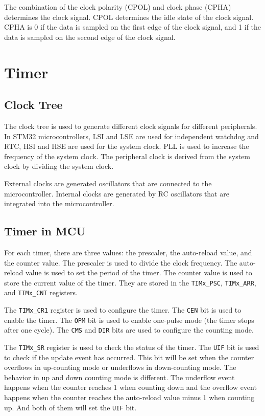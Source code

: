 \documentclass[a4paper,12pt]{article}
\begin{document}
The combination of the clock polarity (CPOL) and clock phase (CPHA) determines the clock signal. CPOL determines the idle state of the clock signal. CPHA is 0 if the data is sampled on the first edge of the clock signal, and 1 if the data is sampled on the second edge of the clock signal.

\section{Timer}

\subsection{Clock Tree}

The clock tree is used to generate different clock signals for different peripherals. In STM32 microcontrollers, LSI and LSE are used for independent watchdog and RTC, HSI and HSE are used for the system clock. PLL is used to increase the frequency of the system clock. The peripheral clock is derived from the system clock by dividing the system clock.

External clocks are generated oscillators that are connected to the microcontroller. Internal clocks are generated by RC oscillators that are integrated into the microcontroller.

\subsection{Timer in MCU}

For each timer, there are three values: the prescaler, the auto-reload value, and the counter value. The prescaler is used to divide the clock frequency. The auto-reload value is used to set the period of the timer. The counter value is used to store the current value of the timer. They are stored in the \texttt{TIMx\_PSC}, \texttt{TIMx\_ARR}, and \texttt{TIMx\_CNT} registers.

The \texttt{TIMx\_CR1} register is used to configure the timer. The \texttt{CEN} bit is used to enable the timer. The \texttt{OPM} bit is used to enable one-pulse mode (the timer stops after one cycle). The \texttt{CMS} and \texttt{DIR} bits are used to configure the counting mode.

The \texttt{TIMx\_SR} register is used to check the status of the timer. The \texttt{UIF} bit is used to check if the update event has occurred. This bit will be set when the counter overflows in up-counting mode or underflows in down-counting mode. The behavior in up and down counting mode is different. The underflow event happens when the counter reaches 1 when counting down and the overflow event happens when the counter reaches the auto-reload value minus 1 when counting up. And both of them will set the \texttt{UIF} bit.
\end{document}
